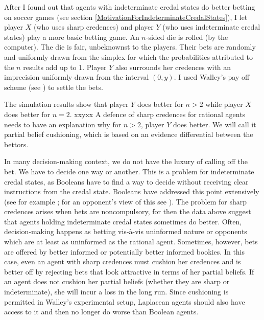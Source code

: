 After I found out that agents with indeterminate credal
states do better betting on soccer games (see section
\ref{MotivationForIndeterminateCredalStates}), I let
player $X$ (who uses sharp credences) and player $Y$
(who uses indeterminate credal states) play a more
basic betting game. An $n$-sided die is rolled (by the
computer). The die is fair, unbeknownst to the players.
Their bets are randomly and uniformly drawn from the
simplex for which the probabilities attributed to the
$n$ results add up to 1. Player $Y$ also surrounds her
credences with an imprecision uniformly drawn from the
interval $(0,y)$. I used Walley's pay off scheme (see
) to settle the bets.

The simulation results show that player $Y$ does better
for $n>2$ while player $X$ does better for $n=2$. xxyxx
A defence of sharp credences for rational agents needs
to have an explanation why for $n>2$, player $Y$ does
better. We will call it partial belief cushioning,
which is based on an evidence differential between the
bettors.

In many decision-making context, we do not have the
luxury of calling off the bet. We have to decide one
way or another. This is a problem for indeterminate
credal states, as Booleans have to find a way to decide
without receiving clear instructions from the credal
state. Booleans have addressed this point extensively
(see for example ; for an
opponent's view of this see ).
The problem for sharp credences arises when bets are
noncompulsory, for then the data above suggest that
agents holding indeterminate credal states sometimes do
better. Often, decision-making happens as betting
vis-{\`a}-vis uninformed nature or opponents which are
at least as uninformed as the rational agent.
Sometimes, however, bets are offered by better informed
or potentially better informed bookies. In this case,
even an agent with sharp credences must cushion her
credences and is better off by rejecting bets that look
attractive in terms of her partial beliefs. If an agent
does not cushion her partial beliefs (whether they are
sharp or indeterminate), she will incur a loss in the
long run. Since cushioning is permitted in Walley's
experimental setup, Laplacean agents should also have
access to it and then no longer do worse than Boolean
agents.

